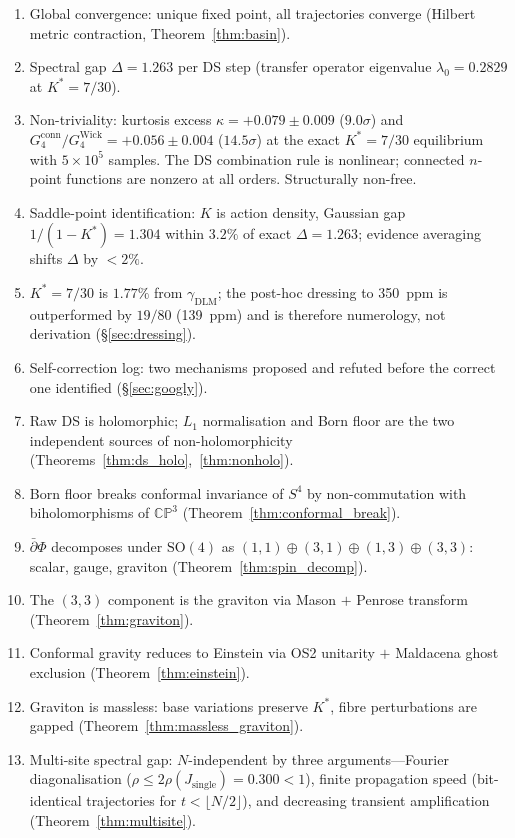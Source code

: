 \documentclass[11pt,a4paper]{article}
\theoremstyle{definition}
\theoremstyle{remark}
\newcommand{\CP}{\mathbb{CP}}
\newcommand{\dbar}{\bar{\partial}}
\begin{document}
\begin{enumerate}[nosep]
\item Global convergence: unique fixed point, all trajectories converge (Hilbert metric contraction, Theorem~\ref{thm:basin}).
\item Spectral gap $\Delta=1.263$ per DS step (transfer operator eigenvalue $\lambda_0=0.2829$ at $K^*=7/30$).
\item Non-triviality: kurtosis excess $\kappa=+0.079\pm 0.009$ ($9.0\sigma$) and $G_4^{\mathrm{conn}}/G_4^{\mathrm{Wick}}=+0.056\pm 0.004$ ($14.5\sigma$) at the exact $K^*=7/30$ equilibrium with $5\times 10^5$ samples. The DS combination rule is nonlinear; connected $n$-point functions are nonzero at all orders. Structurally non-free.
\item Saddle-point identification: $K$ is action density, Gaussian gap $1/(1-K^*)=1.304$ within $3.2\%$ of exact $\Delta=1.263$; evidence averaging shifts $\Delta$ by $<2\%$.
\item $K^*=7/30$ is $1.77\%$ from $\gamma_{\mathrm{DLM}}$; the post-hoc dressing to 350~ppm is outperformed by $19/80$ (139~ppm) and is therefore numerology, not derivation (\S\ref{sec:dressing}).
\item Self-correction log: two mechanisms proposed and refuted before the correct one identified (\S\ref{sec:googly}).
\item Raw DS is holomorphic; $L_1$ normalisation and Born floor are the two independent sources of non-holomorphicity (Theorems~\ref{thm:ds_holo},~\ref{thm:nonholo}).
\item Born floor breaks conformal invariance of $S^4$ by non-commutation with biholomorphisms of $\CP^3$ (Theorem~\ref{thm:conformal_break}).
\item $\dbar\Phi$ decomposes under $\mathrm{SO}(4)$ as $(1,1)\oplus(3,1)\oplus(1,3)\oplus(3,3)$: scalar, gauge, graviton (Theorem~\ref{thm:spin_decomp}).
\item The $(3,3)$ component is the graviton via Mason $+$ Penrose transform (Theorem~\ref{thm:graviton}).
\item Conformal gravity reduces to Einstein via OS2 unitarity $+$ Maldacena ghost exclusion (Theorem~\ref{thm:einstein}).
\item Graviton is massless: base variations preserve $K^*$, fibre perturbations are gapped (Theorem~\ref{thm:massless_graviton}).
\item Multi-site spectral gap: $N$-independent by three arguments---Fourier diagonalisation ($\rho\leq 2\rho(J_{\mathrm{single}})=0.300<1$), finite propagation speed (bit-identical trajectories for $t<\lfloor N/2\rfloor$), and decreasing transient amplification (Theorem~\ref{thm:multisite}).

\end{enumerate}
\end{document}
